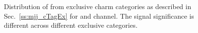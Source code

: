 \begin{figure}
\caption{Distribution of \mjj from exclusive charm categories as described in
Sec.~\ref{ss:mjj_cTagEx} for \mujets and \ejets channel. The signal significance is different across different
exclusive categories.}
\label{fig:mjj_cTagEx}
\end{figure}
